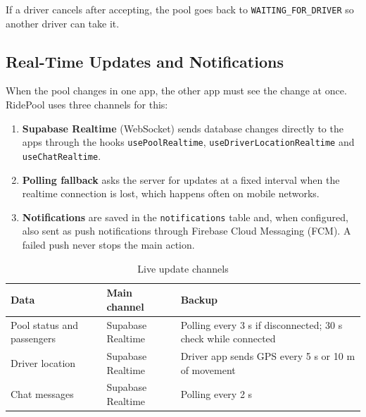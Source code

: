 If a driver cancels after accepting, the pool goes back to
\texttt{WAITING\_FOR\_DRIVER} so another driver can take it.

\subsection{Real-Time Updates and Notifications}
\label{subsec:realtime}

When the pool changes in one app, the other app must see the change at once.
RidePool uses three channels for this:

\begin{enumerate}
  \item \textbf{Supabase Realtime} (WebSocket) sends database changes directly
        to the apps through the hooks \texttt{usePoolRealtime},
        \texttt{useDriverLocationRealtime} and \texttt{useChatRealtime}.
  \item \textbf{Polling fallback} asks the server for updates at a fixed
        interval when the realtime connection is lost, which happens often on
        mobile networks.
  \item \textbf{Notifications} are saved in the \texttt{notifications} table
        and, when configured, also sent as push notifications through Firebase
        Cloud Messaging (FCM). A failed push never stops the main action.
\end{enumerate}

\begin{table}[H]
  \centering
  \small
  \caption{Live update channels}
  \label{tab:live-intervals}
  \begin{tabularx}{\textwidth}{@{}p{4cm}p{3.4cm}L@{}}
    \toprule
    \textbf{Data} & \textbf{Main channel} & \textbf{Backup} \\
    \midrule
    Pool status and passengers & Supabase Realtime & Polling every 3 s if disconnected; 30 s check while connected \\
    Driver location            & Supabase Realtime & Driver app sends GPS every 5 s or 10 m of movement \\
    Chat messages              & Supabase Realtime & Polling every 2 s \\
    \bottomrule
  \end{tabularx}
\end{table}


